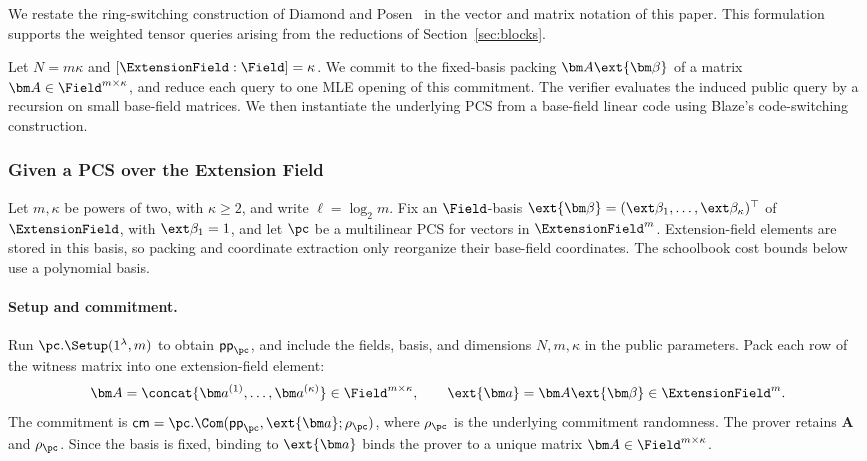 We restate the ring-switching construction of Diamond and
Posen~\cite{eurocrypt/DiamondP26} in the vector and matrix notation
of this paper. This formulation supports the weighted tensor
queries arising from the reductions of Section~\ref{sec:blocks}.

Let \(N=m\kappa\) and \([\ExtensionField:\Field]=\kappa\).
We commit to the fixed-basis packing \(\bm A\ext{\bm\beta}\)
of a matrix \(\bm A\in\Field^{m\times\kappa}\), and reduce
each query to one MLE opening of this commitment.
The verifier evaluates the induced public query by a recursion
on small base-field matrices.
We then instantiate the underlying PCS from a base-field linear
code using Blaze's code-switching construction.

\subsubsection{Given a PCS over the Extension Field}

\medskip{}

Let \(m,\kappa\) be powers of two, with \(\kappa\geq2\), and write
\(\ell=\log_2m\).
Fix an \(\Field\)-basis
\(\ext{\bm\beta}=(\ext\beta_1,\ldots,\ext\beta_\kappa)^\top\)
of \(\ExtensionField\), with \(\ext\beta_1=1\), and let \(\pc\)
be a multilinear PCS for vectors in \(\ExtensionField^m\).
Extension-field elements are stored in this basis, so packing
and coordinate extraction only reorganize their base-field coordinates.
The schoolbook cost bounds below use a polynomial basis.

\paragraph{Setup and commitment.}
Run \(\pc.\Setup(1^\lambda,m)\) to obtain
\(\mathsf{pp}_{\pc}\), and include the fields, basis, and dimensions
\(N,m,\kappa\) in the public parameters.
Pack each row of the witness matrix into one extension-field element:
\[
    \bm A=\concat{\bm a^{(1)},\ldots,\bm a^{(\kappa)}}
        \in\Field^{m\times\kappa},
    \qquad
    \ext{\bm a}=\bm A\ext{\bm\beta}\in\ExtensionField^m.
\]
The commitment is
\(\mathsf{cm}=\pc.\Com(\mathsf{pp}_{\pc},\ext{\bm a};
\rho_{\pc})\), where \(\rho_{\pc}\) is the underlying commitment
randomness. The prover retains \(\bm A\) and \(\rho_{\pc}\).
Since the basis is fixed, binding to \(\ext{\bm a}\) binds the
prover to a unique matrix \(\bm A\in\Field^{m\times\kappa}\).

